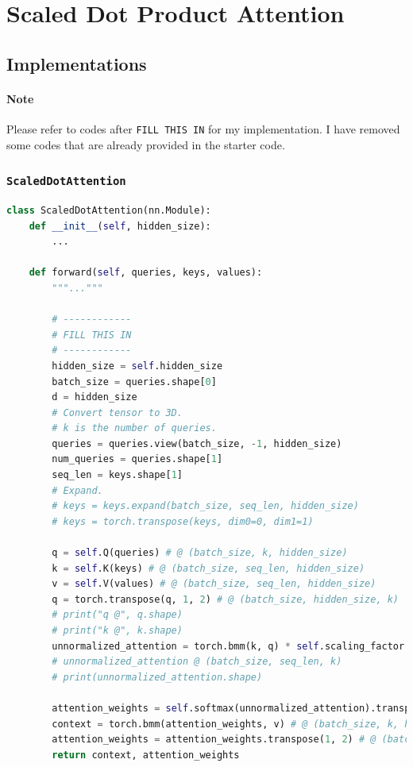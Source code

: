 \documentclass{article}
\begin{document}
\section{Scaled Dot Product Attention}
\subsection{Implementations}
\paragraph{Note} Please refer to codes after \texttt{FILL THIS IN} for my implementation. I have removed some codes that are already provided in the starter code.
\subsubsection{\texttt{ScaledDotAttention}}
\begin{lstlisting}[language=python]
class ScaledDotAttention(nn.Module):
    def __init__(self, hidden_size):
        ...

    def forward(self, queries, keys, values):
    	"""..."""

        # ------------
        # FILL THIS IN
        # ------------
        hidden_size = self.hidden_size
        batch_size = queries.shape[0]
        d = hidden_size
        # Convert tensor to 3D.
        # k is the number of queries.
        queries = queries.view(batch_size, -1, hidden_size)
        num_queries = queries.shape[1]
        seq_len = keys.shape[1]
        # Expand.
        # keys = keys.expand(batch_size, seq_len, hidden_size)
        # keys = torch.transpose(keys, dim0=0, dim1=1)

        q = self.Q(queries) # @ (batch_size, k, hidden_size)
        k = self.K(keys) # @ (batch_size, seq_len, hidden_size)
        v = self.V(values) # @ (batch_size, seq_len, hidden_size)
        q = torch.transpose(q, 1, 2) # @ (batch_size, hidden_size, k)
        # print("q @", q.shape)
        # print("k @", k.shape)
        unnormalized_attention = torch.bmm(k, q) * self.scaling_factor
        # unnormalized_attention @ (batch_size, seq_len, k)
        # print(unnormalized_attention.shape)
    
        attention_weights = self.softmax(unnormalized_attention).transpose(1, 2) # @ (batch_size, k, seq_len)
        context = torch.bmm(attention_weights, v) # @ (batch_size, k, hidden_size)
        attention_weights = attention_weights.transpose(1, 2) # @ (batch_size, seq_len, k)
        return context, attention_weights
\end{lstlisting}
\end{document}
